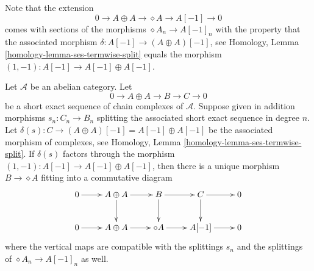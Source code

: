\noindent
Note that the extension
$$
0 \to
A \oplus A \to
\diamond A \to
A[-1] \to
0
$$
comes with sections of the morphisms $\diamond A_n \to A[-1]_n$
with the property that the associated morphism
$\delta : A[-1] \to (A \oplus A)[-1]$, see
Homology, Lemma \ref{homology-lemma-ses-termwise-split}
equals the morphism $(1, -1) : A[-1] \to A[-1] \oplus A[-1]$.

\begin{lemma}
\label{lemma-map-into-diamond}
Let $\mathcal{A}$ be an abelian category.
Let
$$
0 \to A \oplus A \to B \to C \to 0
$$
be a short exact sequence of chain complexes of $\mathcal{A}$.
Suppose given in addition morphisms $s_n : C_n \to B_n$
splitting the associated short exact sequence in degree $n$.
Let $\delta(s) : C \to (A \oplus A)[-1] = A[-1] \oplus A[-1]$
be the associated morphism of complexes, see
Homology, Lemma \ref{homology-lemma-ses-termwise-split}.
If $\delta(s)$ factors through the morphism
$(1, -1) : A[-1] \to A[-1] \oplus A[-1]$, then
there is a unique morphism $B \to \diamond A$
fitting into a commutative diagram
$$
\xymatrix{
0 \ar[r] &
A \oplus A \ar[d] \ar[r] &
B \ar[r] \ar[d] &
C \ar[d] \ar[r] &
0 \\
0 \ar[r] &
A \oplus A \ar[r] &
\diamond A \ar[r] &
A[-1] \ar[r] &
0
}
$$
where the vertical maps are compatible with the splittings
$s_n$ and the splittings of $\diamond A_n \to A[-1]_n$
as well.
\end{lemma}

